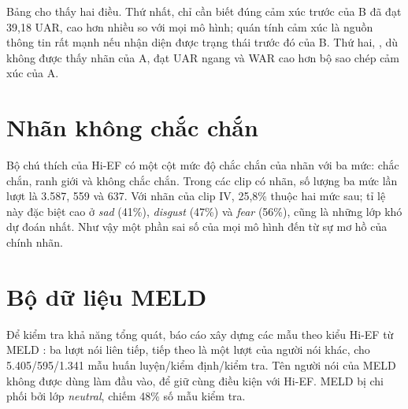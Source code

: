 Bảng cho thấy hai điều. Thứ nhất, chỉ cần biết đúng cảm xúc trước của B đã đạt 39,18 UAR, cao hơn nhiều so với mọi mô hình; quán tính cảm xúc là nguồn thông tin rất mạnh nếu nhận diện được trạng thái trước đó của B. Thứ hai, \model{}, dù không được thấy nhãn của A, đạt UAR ngang và WAR cao hơn bộ sao chép cảm xúc của A.

\section{Nhãn không chắc chắn}

Bộ chú thích của Hi-EF có một cột mức độ chắc chắn của nhãn với ba mức: chắc chắn, ranh giới và không chắc chắn. Trong các clip có nhãn, số lượng ba mức lần lượt là 3.587, 559 và 637. Với nhãn của clip IV, 25,8\% thuộc hai mức sau; tỉ lệ này đặc biệt cao ở \emph{sad} (41\%), \emph{disgust} (47\%) và \emph{fear} (56\%), cũng là những lớp khó dự đoán nhất. Như vậy một phần sai số của mọi mô hình đến từ sự mơ hồ của chính nhãn.

\section{Bộ dữ liệu MELD}

Để kiểm tra khả năng tổng quát, báo cáo xây dựng các mẫu theo kiểu Hi-EF từ MELD \cite{poria2019meld}: ba lượt nói liên tiếp, tiếp theo là một lượt của người nói khác, cho 5.405/595/1.341 mẫu huấn luyện/kiểm định/kiểm tra. Tên người nói của MELD không được dùng làm đầu vào, để giữ cùng điều kiện với Hi-EF. MELD bị chi phối bởi lớp \emph{neutral}, chiếm 48\% số mẫu kiểm tra.
